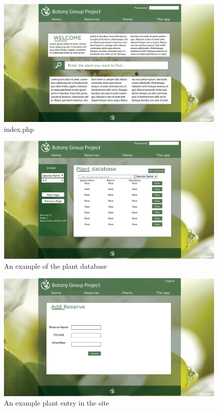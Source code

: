         \begin{landscape}
            \begin{figure}
                \centering
                \includegraphics[scale=0.4]{uiDesign/uiwebimages/index.png}
                \caption{index.php}
                \label{fig:indexWebpage}
            \end{figure}

            \begin{figure}
                \centering
                \includegraphics[scale=0.4]{uiDesign/uiwebimages/plantdb.png}
                \caption{An example of the plant database}
                \label{fig:plantDbWeb}
            \end{figure}

            \begin{figure}
                \centering
                \includegraphics[scale=0.4]{uiwebimages/addreserve.png}
                \caption{An example plant entry in the site}
                \label{fig:viewWeb}
            \end{figure}


\end{landscape}
